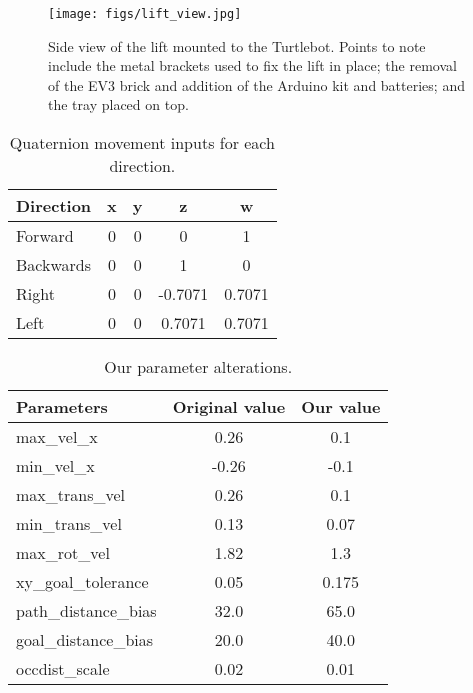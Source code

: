\documentclass{article}
\begin{document}
\begin{figure}
  \begin{center}
    \texttt{[image: figs/lift\_view.jpg]}
    \caption{Side view of the lift mounted to the Turtlebot. Points to note include the metal brackets used to fix the lift in place; the removal of the EV3 brick and addition of the Arduino kit and batteries; and the tray placed on top.}
  \label{fig:lift}
  \end{center}
\end{figure}
\begin{table}[h]
\vskip 3mm
\begin{center}
\begin{tabular}{lcccc}
\hline
\abovespace\belowspace
Direction & x & y & z & w \\
\hline
  Forward & 0 & 0 & 0 & 1\\
  Backwards & 0 & 0 & 1 & 0 \\
  Right & 0 & 0 & -0.7071 & 0.7071 \\
  Left & 0 & 0 & 0.7071 & 0.7071 
\end{tabular}
\caption{Quaternion movement inputs for each direction.}
\label{tab:quaternions}
\end{center}
\vskip -3mm
\end{table}
\begin{table}[h]
\vskip 3mm
\begin{center}
\begin{tabular}{lcc}
\hline
\abovespace\belowspace
Parameters & Original value & Our value \\
\hline
  max\_vel\_x & 0.26 & 0.1 \\
  min\_vel\_x & -0.26 & -0.1 \\
  max\_trans\_vel & 0.26 & 0.1 \\
  min\_trans\_vel & 0.13 & 0.07 \\
  max\_rot\_vel & 1.82 & 1.3 \\
  xy\_goal\_tolerance & 0.05 & 0.175 \\
  path\_distance\_bias & 32.0 & 65.0 \\
  goal\_distance\_bias & 20.0 & 40.0 \\
  occdist\_scale & 0.02 & 0.01
\end{tabular}
\caption{Our parameter alterations.}
\label{tab:params}
\end{center}
\vskip -3mm
\end{table}
\end{document}
